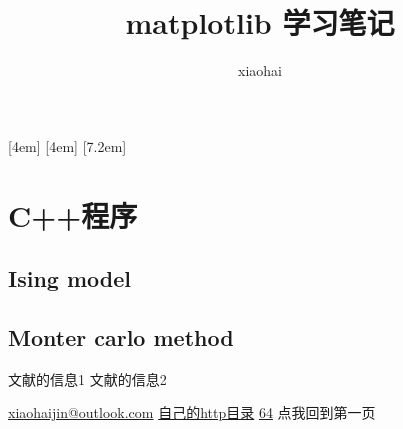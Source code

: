 \documentclass[11pt,UTF8,hyperref,openany]{ctexbook}
\author{xiaohai}
\title{matplotlib 学习笔记}
\begin{document}

\maketitle

[4em]{\addvspace{2.3mm}\bf}{%
  \contentslabel{4.0em}}{}{\titlerule*[5pt]{$\cdot$}\contentspage}
[4em]{}{\contentslabel{2.5em}}{}{%
  \titlerule*[5pt]{$\cdot$}\contentspage}
[7.2em]{}{\contentslabel{3.3em}}{}{%
  \titlerule*[5pt]{$\cdot$}\contentspage}
\tableofcontents






\appendix
\chapter{C++程序}
\section{Ising model}
\section{Monter carlo method}

\begin{thebibliography}{99}
文献的信息1
文献的信息2
\end{thebibliography}

\noindent\url{xiaohaijin@outlook.com}\newline
\href{http://192.168.1.119/self/index.html}{自己的http目录}\newline
\href{http://10.10.11.64}{64}\newline
点我回到第一页
\end{document}
